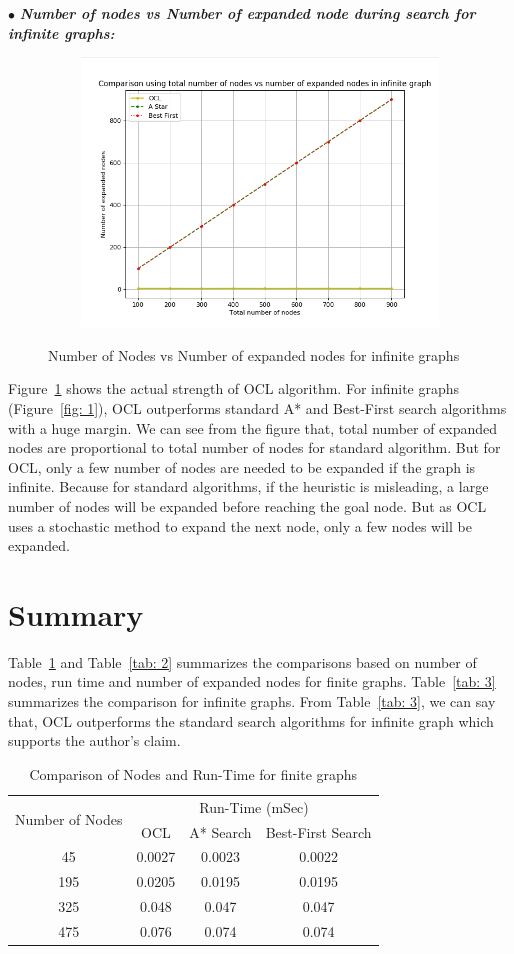 \documentclass[12pt]{article}
\begin{document}
\hspace*{0.5cm}$\bullet$ \textit{\textbf{Number of nodes vs Number of expanded node during search for infinite graphs:}}

\begin{figure}[ht]
		\centering
		{\includegraphics[width=5.0in,height=2.8125in]{inf_1.png}}
		\caption{Number of Nodes vs Number of expanded nodes for infinite graphs}
        \label{fig: 6}
\end{figure}

Figure~\ref{fig: 6} shows the actual strength of OCL algorithm. For infinite graphs (Figure~\ref{fig: 1}), OCL outperforms standard A* and Best-First search algorithms with a huge margin. We can see from the figure that, total number of expanded nodes are proportional to total number of nodes for standard algorithm. But for OCL, only a few number of nodes are needed to be expanded if the graph is infinite. Because for standard algorithms, if the heuristic is misleading, a large number of nodes will be expanded before reaching the goal node. But as OCL uses a stochastic method to expand the next node, only a few nodes will be expanded.

\section{Summary}
Table~\ref{tab: 1} and Table~\ref{tab: 2} summarizes the comparisons based on number of nodes, run time and number of expanded nodes for finite graphs. Table~\ref{tab: 3} summarizes the comparison for infinite graphs. From Table~\ref{tab: 3}, we can say that, OCL outperforms the standard search algorithms for infinite graph which supports the author's claim.

\begin{table}[ht]
\centering
\begin{tabular}{|c|c|c|c|}
\hline
\multirow{2}{*}{Number of Nodes} & \multicolumn{3}{c|}{Run-Time (mSec)} \\ \cline{2-4} 
 & OCL & A* Search & Best-First Search \\ \hline
45 & 0.0027 & 0.0023 & 0.0022 \\ \hline
195 & 0.0205 & 0.0195 & 0.0195 \\ \hline
325 & 0.048 & 0.047 & 0.047 \\ \hline
475 & 0.076 & 0.074 & 0.074 \\ \hline
\end{tabular}
\caption{Comparison of Nodes and Run-Time for finite graphs}
\label{tab: 1}
\end{table}
\end{document}
